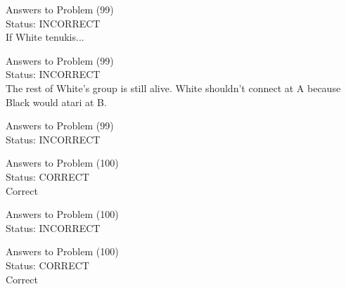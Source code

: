 \documentclass[11pt]{article}
\begin{document}
\begin{minipage}[t]{0.5\textwidth}
  {\centering
  
  Answers to Problem (99)\\
  Status: INCORRECT\\
  If White tenukis...\\
  }
\end{minipage}
\begin{minipage}[t]{0.5\textwidth}
  {\centering
  
  Answers to Problem (99)\\
  Status: INCORRECT\\
  The rest of White's group is still alive. White shouldn't connect at A because Black would atari at B.\\
  }
\end{minipage}
\begin{minipage}[t]{0.5\textwidth}
  {\centering
  
  Answers to Problem (99)\\
  Status: INCORRECT\\
  
  }
\end{minipage}
\begin{minipage}[t]{0.5\textwidth}
  {\centering
  
  Answers to Problem (100)\\
  Status: CORRECT\\
  Correct\\
  }
\end{minipage}
\begin{minipage}[t]{0.5\textwidth}
  {\centering
  
  Answers to Problem (100)\\
  Status: INCORRECT\\
  
  }
\end{minipage}
\begin{minipage}[t]{0.5\textwidth}
  {\centering
  
  Answers to Problem (100)\\
  Status: CORRECT\\
  Correct\\
  }
\end{minipage}
\end{document}
